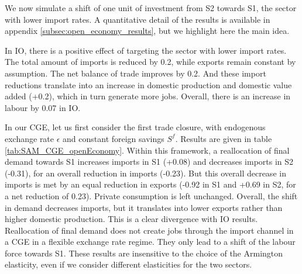 We now simulate a shift of one unit of investment from S2 towards S1, the sector with lower import rates. A quantitative detail of the results is available in appendix \ref{subsec:open_economy_results}, but we highlight here the main idea. 

In IO, there is a positive effect of targeting the sector with lower import rates. The total amount of imports is reduced by 0.2, while exports remain constant by assumption. The net balance of trade improves by 0.2. And these import reductions translate into an increase in domestic production and domestic value added (+0.2), which in turn generate more jobs. Overall, there is an increase in labour by 0.07 in IO.

In our CGE, let us first consider the first trade closure, with endogenous exchange rate $\epsilon$ and constant foreign savings $S^f$. Results are given in table \ref{tab:SAM_CGE_openEconomy}. Within this framework, a reallocation of final demand towards S1 increases imports in S1 (+0.08) and decreases imports in S2 (-0.31), for an overall reduction in imports (-0.23). But this overall decrease in imports is met by an equal reduction in exports (-0.92 in S1 and +0.69 in S2, for a net reduction of 0.23).
Private consumption is left unchanged.
Overall, the shift in demand decreases imports, but it translates into lower exports rather than higher domestic production. This is a clear divergence with IO results. Reallocation of final demand does not create jobs through the import channel in a CGE in a flexible exchange rate regime. They only lead to a shift of the labour force towards S1. 
These results are insensitive to the choice of the Armington elasticity, even if we consider different elasticities for the two sectors. 

